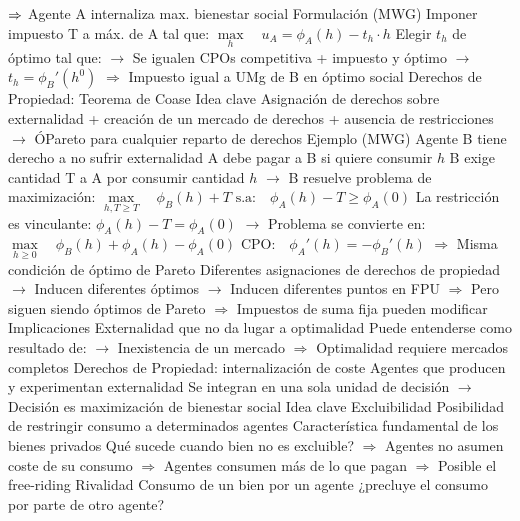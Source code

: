 \documentclass{nuevotema}
\begin{document}
\begin{esquemal}
				\4[] $\Rightarrow$ Agente A internaliza max. bienestar social
				\4 Formulación (MWG)
				\4[] Imponer impuesto T a máx. de A tal que:
				\4[] $\underset{h}{\max} \quad u_A = \phi_A(h) - t_h \cdot h $
				\4[] 
				\4[] Elegir $t_h$ de óptimo tal que:
				\4[] $\to$ Se igualen CPOs competitiva + impuesto y óptimo
				\4[] $\to$ $t_h = \phi_B'(h^0)$
				\4[] $\Rightarrow$ Impuesto igual a UMg de B en óptimo social
				\4[] 
			\3 Derechos de Propiedad: Teorema de Coase
				\4 Idea clave
				\4[] Asignación de derechos sobre externalidad
				\4[] + creación de un mercado de derechos
				\4[] + ausencia de restricciones
				\4[] $\to$ ÓPareto para cualquier reparto de derechos
				\4 Ejemplo (MWG)
				\4[] Agente B tiene derecho a no sufrir externalidad
				\4[] A debe pagar a B si quiere consumir $h$
				\4[] B exige cantidad T a A por consumir cantidad $h$
				\4[] $\to$ B resuelve problema de maximización:
				\4[] $ \underset{h,T \geq T}{\max} \quad \phi_B(h) + T$
				\4[] $\text{s.a:} \quad \phi_A(h) - T \geq \phi_A(0)$
				\4[] La restricción es vinculante: $\phi_A(h) -T = \phi_A(0)$
				\4[] $\to$ Problema se convierte en:
				\4[] $\underset{h \geq 0}{\max} \quad \phi_B(h) + \phi_A(h) - \phi_A(0)$
				\4[] $\text{CPO:} \quad \phi_A'(h) = - \phi_B'(h)$
				\4[] $\Rightarrow$ Misma condición de óptimo de Pareto
				\4[] Diferentes asignaciones de derechos de propiedad
				\4[] $\to$ Inducen diferentes óptimos
				\4[] $\to$ Inducen diferentes puntos en FPU
				\4[] $\Rightarrow$ Pero siguen siendo óptimos de Pareto
				\4[] $\Rightarrow$ Impuestos de suma fija pueden modificar
				\4 Implicaciones
				\4[] Externalidad que no da lugar a optimalidad
				\4[] Puede entenderse como resultado de:
				\4[] $\to$ Inexistencia de un mercado
				\4[] $\Rightarrow$ Optimalidad requiere mercados completos
			\3 Derechos de Propiedad: internalización de coste
				\4 Agentes que producen y experimentan externalidad
				\4[] Se integran en una sola unidad de decisión
				\4[] $\to$ Decisión es maximización de bienestar social
	\1 
		\2 Idea clave
			\3 Excluibilidad
				\4 Posibilidad de restringir consumo a determinados agentes
				\4[] Característica fundamental de los bienes privados
				\4 Qué sucede cuando bien no es excluible?
				\4[] $\Rightarrow$ Agentes no asumen coste de su consumo
				\4[] $\Rightarrow$ Agentes consumen más de lo que pagan
				\4[] $\Rightarrow$ Posible el free-riding
			\3 Rivalidad
				\4 Consumo de un bien por un agente
				\4[] ¿precluye el consumo por parte de otro agente?

\end{esquemal}
\end{document}
